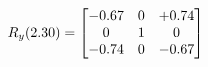 \documentclass[preview]{standalone}
\begin{document}
\begin{align*}
\special{dvisvgm:raw <g id='unique000'>}R_{y}(2.30) = \begin{bmatrix}-0.67 & 0 & +0.74 \\0 & 1 & 0 \\-0.74 & 0 & -0.67\end{bmatrix}\special{dvisvgm:raw </g>}
\end{align*}
\end{document}
